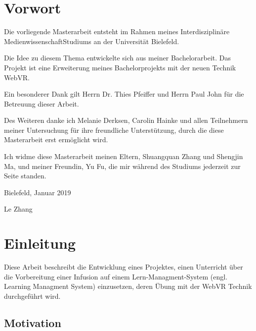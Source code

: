 \chapter*{Vorwort}

Die vorliegende Masterarbeit entsteht im Rahmen meines \glqq Interdisziplinäre Medienwissenschaft\grqq\-Studiums an der Universität Bielefeld.
 
Die Idee zu diesem Thema entwickelte sich aus meiner Bachelorarbeit. Das Projekt ist eine Erweiterung meines Bachelorprojekts mit der neuen Technik WebVR.
 
Ein besonderer Dank gilt Herrn Dr. Thies Pfeiffer und Herrn Paul John für die Betreuung dieser Arbeit.
 
Des Weiteren danke ich Melanie Derksen, Carolin Hainke und allen Teilnehmern meiner Untersuchung für ihre freundliche Unterstützung, durch die diese Masterarbeit erst ermöglicht wird.
 
Ich widme diese Masterarbeit meinen Eltern, Shuangquan Zhang und Shengjin Ma, und meiner Freundin, Yu Fu, die mir während des Studiums jederzeit zur Seite standen.

\vspace{5mm}
 
Bielefeld, Januar 2019
 
Le Zhang

\chapter{Einleitung}

Diese Arbeit beschreibt die Entwicklung eines Projektes, einen Unterricht über die Vorbereitung einer Infusion auf einem Lern-Managment-System (engl. Learning Managment System) einzusetzen, deren Übung mit der WebVR Technik durchgeführt wird.

\section{Motivation}



